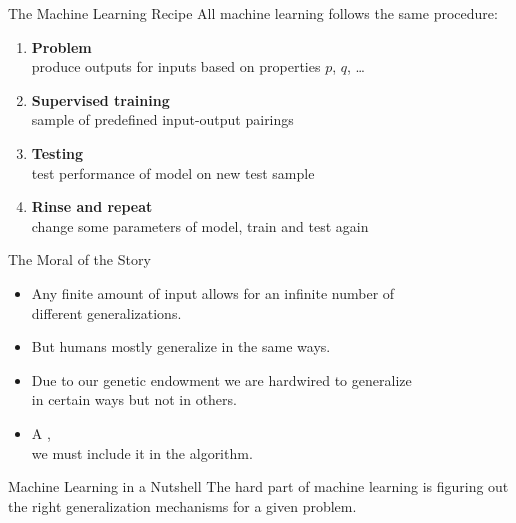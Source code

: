 \documentclass[xcolor={usenames,svgnames,x11names,dvipsnames,table}]{beamer}
\begin{document}
\begin{frame}{The Machine Learning Recipe}
    All machine learning follows the same procedure:

    \begin{enumerate}
        \item \textbf{Problem}\\
            produce outputs for inputs based on properties $p$, $q$, \ldots\\
        \item \textbf{Supervised training}\\
            sample of predefined input-output pairings\\
        \item \textbf{Testing}\\
            test performance of model on new test sample
        \item \textbf{Rinse and repeat}\\
            change some parameters of model, train and test again
    \end{enumerate}

    \begin{center}
    \end{center}
\end{frame}

\begin{frame}{The Moral of the Story}
    \begin{itemize}
        \item Any finite amount of input allows for an infinite number of\\
            different generalizations.
        \item But humans mostly generalize in the same ways.
        \item Due to our genetic endowment we are hardwired to generalize\\
            in certain ways but not in others.
        \item A ,\\
            we must include it in the algorithm.
    \end{itemize}

    \pause
    \begin{alertblock}{Machine Learning in a Nutshell}
        The hard part of machine learning is figuring out the right generalization mechanisms for a given problem.
    \end{alertblock}
\end{frame}
\end{document}
